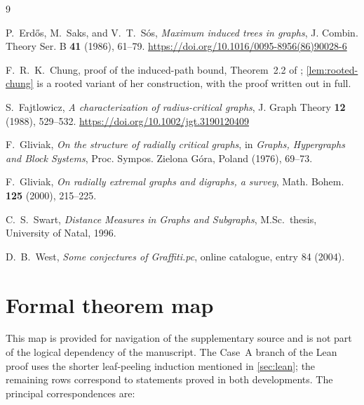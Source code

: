 \documentclass[11pt]{article}
\theoremstyle{definition}
\begin{document}
\begin{thebibliography}{9}

P.~Erd\H{o}s, M.~Saks, and V.~T.~S\'os,
\emph{Maximum induced trees in graphs},
J. Combin. Theory Ser. B \textbf{41} (1986), 61--79.
\url{https://doi.org/10.1016/0095-8956(86)90028-6}

F.~R.~K.~Chung,
proof of the induced-path bound, Theorem~2.2 of \cite{ESS1986};
\cref{lem:rooted-chung} is a rooted variant of her construction, with the
proof written out in full.

S.~Fajtlowicz,
\emph{A characterization of radius-critical graphs},
J. Graph Theory \textbf{12} (1988), 529--532.
\url{https://doi.org/10.1002/jgt.3190120409}

F.~Gliviak,
\emph{On the structure of radially critical graphs},
in \emph{Graphs, Hypergraphs and Block Systems},
Proc. Sympos. Zielona G\'ora, Poland (1976), 69--73.

F.~Gliviak,
\emph{On radially extremal graphs and digraphs, a survey},
Math. Bohem. \textbf{125} (2000), 215--225.

C.~S.~Swart,
\emph{Distance Measures in Graphs and Subgraphs},
M.Sc.\ thesis, University of Natal, 1996.

D.~B.~West,
\emph{Some conjectures of Graffiti.pc},
online catalogue, entry 84 (2004).

\end{thebibliography}

\appendix
\section{Formal theorem map}\label{app:map}

This map is provided for navigation of the supplementary source and is not
part of the logical dependency of the manuscript.  The Case~A branch of the
Lean proof uses the shorter leaf-peeling induction mentioned in
\cref{sec:lean}; the remaining rows correspond to statements proved in both
developments.  The principal correspondences are:
\end{document}
